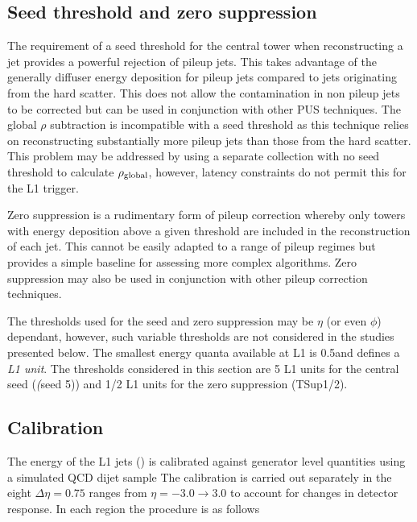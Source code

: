 \subsection{Seed threshold and zero suppression}
\label{sec:seed_thresh}
The requirement of a seed threshold for the central tower when reconstructing a jet
provides a powerful rejection of pileup jets. This takes advantage of the generally 
diffuser energy deposition for pileup jets compared to jets originating from 
the hard scatter. This does not allow the contamination in non pileup jets to be corrected
but can be used in conjunction with other PUS techniques. The global
$\rho$ subtraction is incompatible with a seed threshold as this technique relies
on reconstructing substantially more pileup jets than those from the hard scatter. 
This problem may be addressed by using a separate collection with no seed threshold
to calculate $\rho_{\text{global}}$, however, latency constraints do not permit this for the L1 trigger.

Zero suppression is a rudimentary form of pileup correction whereby only towers with
energy deposition above a given threshold are included in the reconstruction of each jet.
This cannot be easily adapted to a range of pileup regimes but provides a simple baseline 
for assessing more complex algorithms. Zero suppression may also be used in conjunction
with other pileup correction techniques. 

The thresholds used for the seed and zero suppression may be $\eta$ (or even $\phi$) dependant, however,
such variable thresholds are not considered in the studies presented below. The smallest energy quanta
available at L1 is 0.5\GeV and defines a \emph{L1 unit}. The thresholds considered in this section are 5 L1 units
for the central seed (\emph(seed 5)) and 1/2 L1 units for the zero suppression (TSup1/2).

\subsection{Calibration}
\label{sec:calib}
The energy of the L1 jets (\Lonept) is calibrated against generator level quantities using a simulated QCD dijet sample 
The calibration is carried out separately in the eight $\Delta\eta = 0.75$ ranges from $\eta=-3.0\rightarrow3.0$ 
to account for changes in detector response. In each region the procedure is as follows

